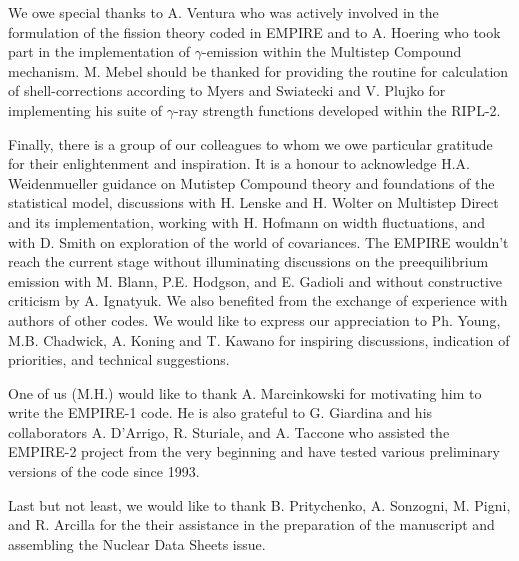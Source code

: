 \documentclass[twocolumn,amsmath,amssymb,10pt,groupedaddress,a4paper]{revtex4}
\begin{document}
We owe special thanks to A. Ventura who was actively involved in the formulation of the fission theory coded in EMPIRE and to A. Hoering who took part in the implementation of $\gamma$-emission within the Multistep Compound mechanism. M. Mebel should be thanked for providing the routine for calculation of shell-corrections according to Myers and Swiatecki and  V. Plujko for implementing his suite of $\gamma$-ray strength functions developed within the RIPL-2.

Finally, there is a group of our colleagues to whom we owe particular gratitude for their enlightenment and inspiration. It is a honour to acknowledge H.A. Weidenmueller guidance on Mutistep Compound theory and foundations of the statistical model, discussions with H. Lenske and H. Wolter on Multistep Direct and its implementation, working with H. Hofmann on width fluctuations, and with D. Smith on exploration of the world of covariances. The EMPIRE wouldn't reach the current stage without illuminating discussions on the preequilibrium emission with M. Blann, P.E. Hodgson, and E. Gadioli and without constructive criticism by A. Ignatyuk. We also benefited from the exchange of experience with  authors of other codes. We would like to express our appreciation to Ph. Young, M.B. Chadwick, A. Koning and T. Kawano for inspiring discussions, indication of priorities, and technical suggestions.

One of us (M.H.) would like to thank A. Marcinkowski for motivating him to write the EMPIRE-1 code. He is also grateful to G. Giardina and his collaborators A. D'Arrigo, R. Sturiale, and A. Taccone who assisted the EMPIRE-2 project from the very beginning and have tested various preliminary versions of the code since 1993.

Last but not least, we would like to thank B. Pritychenko, A. Sonzogni, M. Pigni, and R. Arcilla for the their assistance in the preparation of the manuscript and assembling the Nuclear Data Sheets issue.


\end{document}
